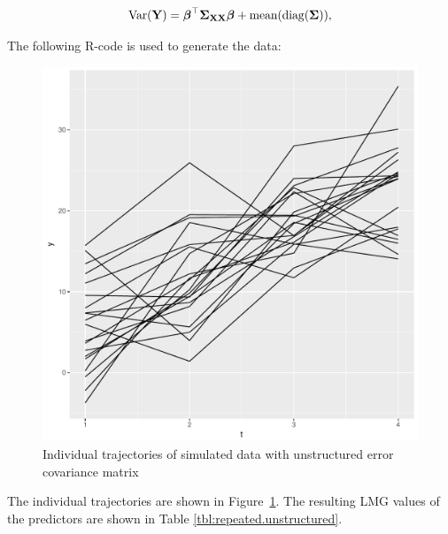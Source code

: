 \documentclass[11pt,a4paper,twoside]{book}\usepackage[]{graphicx}\usepackage[]{color}
\makeatletter
\def\maxwidth{ %
  \ifdim\Gin@nat@width>\linewidth
    \linewidth
  \else
    \Gin@nat@width
  \fi
}
\newenvironment{knitrout}{}{} %
\makeatother
\begin{document}
      \begin{align} 
        \operatorname{Var}({\mathbf{Y}}) = {\boldsymbol{\beta}}^\top {\boldsymbol{\Sigma}}{}_{{\mathbf{X}} {\mathbf{X}}}  {\boldsymbol{\beta}} + \text{mean}(\operatorname{diag}({\boldsymbol{\Sigma}}{})),
   \end{align}

The following R-code is used to generate the data:



\begin{knitrout}
\color{fgcolor}\begin{figure}
\includegraphics[width=\maxwidth]{figure/ch04_figsimdata_repeated_unstruct_plot-1} \caption[Individual trajectories of simulated data with unstructured error covariance matrix]{Individual trajectories of simulated data with unstructured error covariance matrix}\label{fig:simdata.repeated.unstruct.plot}
\end{figure}


\end{knitrout}




The individual trajectories are shown in Figure~\ref{fig:simdata.repeated.unstruct.plot}. The resulting LMG values of the predictors are shown in Table \ref{tbl:repeated.unstructured}.
\end{document}
